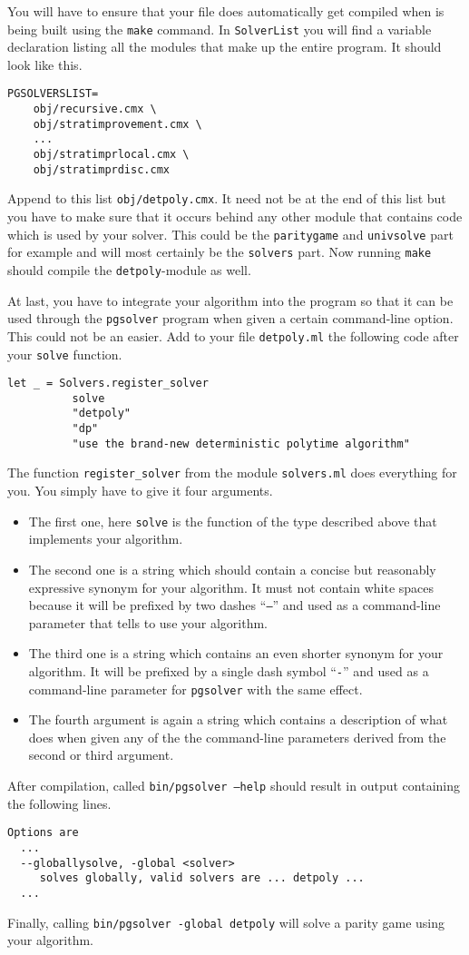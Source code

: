 You will have to ensure that your file does automatically get compiled when \pgsolver is being built using
the \texttt{make} command. In \texttt{SolverList} you will find a variable declaration listing all the modules
that make up the entire program. It should look like this.
\begin{verbatim}
PGSOLVERSLIST=
	obj/recursive.cmx \
	obj/stratimprovement.cmx \
	...
	obj/stratimprlocal.cmx \
	obj/stratimprdisc.cmx 
\end{verbatim}
Append to this list \texttt{obj/detpoly.cmx}. It need not be at the end of this list but you have to make
sure that it occurs behind any other module that contains code which is used by your solver. This could
be the \texttt{paritygame} and \texttt{univsolve} part for example and will most certainly be the
\texttt{solvers} part. Now running \texttt{make} should compile the \texttt{detpoly}-module as well.

At last, you have to integrate your algorithm into the program so that it can be used through the
\texttt{pgsolver} program when given a certain command-line option. This could not be an easier. Add to
your file \texttt{detpoly.ml} the following code after your \texttt{solve} function.
\begin{verbatim}
let _ = Solvers.register_solver
          solve
          "detpoly"
          "dp"
          "use the brand-new deterministic polytime algorithm"
\end{verbatim}
The function \texttt{register\_solver} from the module \texttt{solvers.ml} does everything for you. You
simply have to give it four arguments.
\begin{itemize}
\item The first one, here \texttt{solve} is the function of the type described above that implements
      your algorithm.
\item The second one is a string which should contain a concise but reasonably expressive synonym for your
      algorithm. It must not contain white spaces because it will be prefixed by two dashes ``\texttt{--}''
      and used as a command-line parameter that tells \pgsolver to use your algorithm.
\item The third one is a string which contains an even shorter synonym for your algorithm. It will be
      prefixed by a single dash symbol ``\texttt{-}'' and used as a command-line parameter for \texttt{pgsolver}
      with the same effect.
\item The fourth argument is again a string which contains a description of what \pgsolver does
      when given any of the the command-line parameters derived from the second or third argument.
\end{itemize}
After compilation, called \texttt{bin/pgsolver --help} should result in output containing the following
lines.
\begin{verbatim}
Options are
  ...
  --globallysolve, -global <solver>
     solves globally, valid solvers are ... detpoly ...
  ...
\end{verbatim}
Finally, calling \texttt{bin/pgsolver -global detpoly} will solve a parity game using your algorithm.



